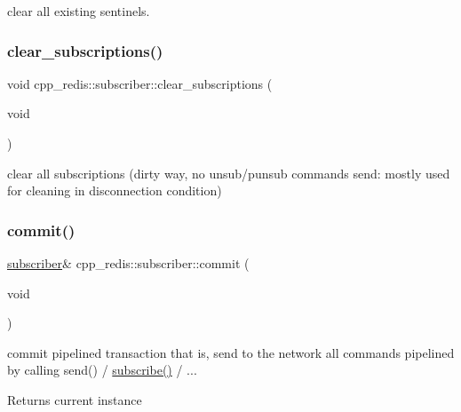 clear all existing sentinels. \mbox{\label{classcpp__redis_1_1subscriber_a1be9e272e3b9d382e9b6c75c0c4bce70}} 
\subsubsection{\texorpdfstring{clear\+\_\+subscriptions()}{clear\_subscriptions()}}
{\footnotesize\ttfamily void cpp\+\_\+redis\+::subscriber\+::clear\+\_\+subscriptions (\begin{DoxyParamCaption}\item[{void}]{ }\end{DoxyParamCaption})\hspace{0.3cm}{\ttfamily [private]}}

clear all subscriptions (dirty way, no unsub/punsub commands send\+: mostly used for cleaning in disconnection condition) \mbox{\label{classcpp__redis_1_1subscriber_abbf600802ed93b82323185eec5719ecb}} 
\subsubsection{\texorpdfstring{commit()}{commit()}}
{\footnotesize\ttfamily \hyperlink{classcpp__redis_1_1subscriber}{subscriber}\& cpp\+\_\+redis\+::subscriber\+::commit (\begin{DoxyParamCaption}\item[{void}]{ }\end{DoxyParamCaption})}

commit pipelined transaction that is, send to the network all commands pipelined by calling send() / \hyperlink{classcpp__redis_1_1subscriber_afee579c702182041645a3d3c55de4b9e}{subscribe()} / ...

\begin{DoxyReturn}{Returns}
current instance 
\end{DoxyReturn}
\mbox{\label{classcpp__redis_1_1subscriber_a6ae8134a9a9b31d6f2434ec4f6e86d3a}} 
